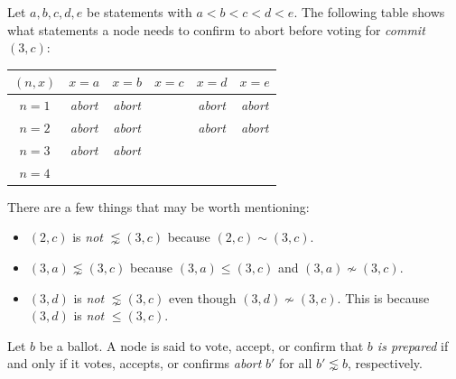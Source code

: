 \begin{exmp}
    Let $a, b, c, d, e$ be statements with $a < b < c < d < e$.
    The following table shows what statements a node needs to confirm to abort before voting for \textit{commit} $(3, c)$:
    \begin{center}
        \begin{tabular}{|c|c|c|c|c|c|}
            \hline
            $(n, x)$ & $x = a$                           & $x = b$                           & $x = c$ & $x = d$                           & $x = e$                           \\ \hline
            $n = 1$  & \cellcolor{blue!25}\textit{abort} & \cellcolor{blue!25}\textit{abort} &         & \cellcolor{blue!25}\textit{abort} & \cellcolor{blue!25}\textit{abort} \\ \hline
            $n = 2$  & \cellcolor{blue!25}\textit{abort} & \cellcolor{blue!25}\textit{abort} &         & \cellcolor{blue!25}\textit{abort} & \cellcolor{blue!25}\textit{abort} \\ \hline
            $n = 3$  & \cellcolor{blue!25}\textit{abort} & \cellcolor{blue!25}\textit{abort} &         &                                   &                                   \\ \hline
            $n = 4$  &                                   &                                   &         &                                   &                                   \\ \hline
        \end{tabular}
    \end{center}

    There are a few things that may be worth mentioning:
    \begin{itemize}
        \item
            $(2, c)$ is \textit{not} $\lnsim (3, c)$ because $(2, c) \sim (3, c)$.
        \item
            $(3, a) \lnsim (3, c)$ because $(3, a) \leq (3, c)$ and $(3, a) \nsim (3, c)$.
        \item
            $(3, d)$ is \textit{not} $\lnsim (3, c)$ even though $(3, d) \nsim (3, c)$.
            This is because $(3, d)$ is \textit{not} $\leq (3, c)$.
    \end{itemize}
\end{exmp}

\begin{defn}[Prepare]\label{def_prepare}
    Let $b$ be a ballot.
    A node is said to vote, accept, or confirm that \textit{$b$ is prepared} if and only if it votes, accepts, or confirms \textit{abort} $b'$ for all $b' \lnsim b$, respectively.
\end{defn}

